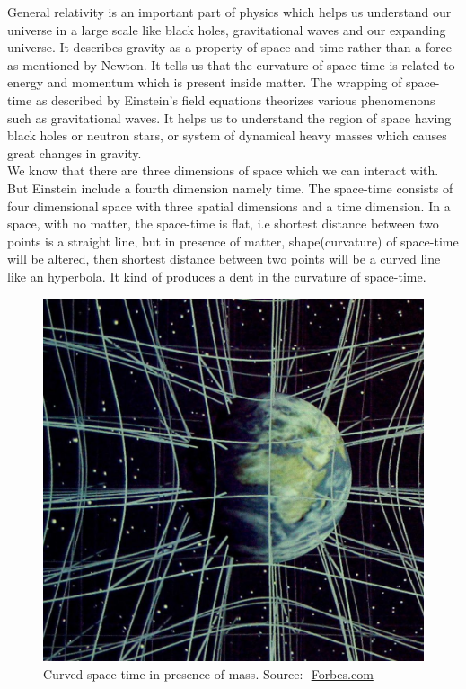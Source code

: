 \hspace{0.5cm} General relativity is an important part of physics which helps us understand our universe in a large scale like black holes, gravitational waves and our expanding universe. It describes gravity as a property of space and time rather than a force as mentioned by Newton. It tells us that the curvature of space-time is related to energy and momentum which is present inside matter. The wrapping of space-time as described by Einstein's field equations theorizes various phenomenons such as gravitational waves. It helps us to understand the region of space having black holes or neutron stars, or system of dynamical heavy masses which causes great changes in gravity.\\ We know that there are three dimensions of space which we can interact with. But Einstein include a fourth dimension namely time. The space-time consists of four dimensional space with three spatial dimensions and a time dimension. In a space, with no matter, the space-time is flat, i.e shortest distance between two points is a straight line, but in presence of matter, shape(curvature) of space-time will be altered, then shortest distance between two points will be a curved line like an hyperbola. It kind of produces a dent in the curvature of space-time. 

\begin{figure}[h]
    \centering
    \includegraphics[scale=0.2]{images.tex/illus_3dspace1.jpg}
    \caption{Curved space-time in presence of mass. Source:- \href{https://www.forbes.com/sites/startswithabang/2019/02/16/ask-ethan-how-can-we-measure-the-curvature-of-gravity/?sh=13c20ec1134f}{Forbes.com}}
\end{figure}

